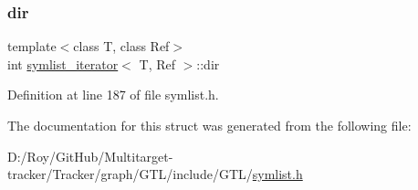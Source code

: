 \subsubsection{\texorpdfstring{dir}{dir}}
{\footnotesize\ttfamily template$<$class T, class Ref$>$ \\
int \mbox{\hyperlink{structsymlist__iterator}{symlist\+\_\+iterator}}$<$ T, Ref $>$\+::dir}



Definition at line 187 of file symlist.\+h.



The documentation for this struct was generated from the following file\+:\begin{DoxyCompactItemize}
\item 
D\+:/\+Roy/\+Git\+Hub/\+Multitarget-\/tracker/\+Tracker/graph/\+G\+T\+L/include/\+G\+T\+L/\mbox{\hyperlink{symlist_8h}{symlist.\+h}}\end{DoxyCompactItemize}

